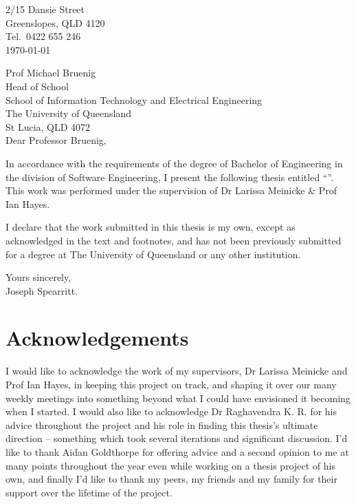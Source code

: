 
\cleardoublepage

\begin{flushright}
	2/15 Dansie Street\\
	Greenslopes, QLD 4120\\
	Tel.\ 0422 655 246\\
	\medskip
	\today
\end{flushright}
\begin{flushleft}
	Prof Michael Bruenig\\
	Head of School\\
	School of Information Technology and Electrical Engineering\\
	The University of Queensland\\
	St Lucia, QLD 4072\\
	\bigskip\bigskip
	Dear Professor Bruenig,
\end{flushleft}

In accordance with the requirements of the degree of Bachelor of Engineering in the division of Software Engineering, I present the following thesis entitled ``\thetitle''. This work was performed under the supervision of Dr Larissa Meinicke \& Prof Ian Hayes.

I declare that the work submitted in this thesis is my own, except as
acknowledged in the text and footnotes, and has not been previously
submitted for a degree at The University of Queensland or any other
institution.
\newline
\begin{flushright}
	Yours sincerely,\\
	\medskip
	$ \; $\vspace*{5mm}\\
	\medskip
	Joseph Spearritt.
\end{flushright}

\cleardoublepage

\chapter{Acknowledgements}

I would like to acknowledge the work of my supervisors, Dr Larissa Meinicke and Prof Ian Hayes, in keeping this project on track, and shaping it over our many weekly meetings into something beyond what I could have envisioned it becoming when I started. I would also like to acknowledge Dr Raghavendra K. R. for his advice throughout the project and his role in finding this thesis's ultimate direction -- something which took several iterations and significant discussion. I'd like to thank Aidan Goldthorpe for offering advice and a second opinion to me at many points throughout the year even while working on a thesis project of his own, and finally I'd like to thank my peers, my friends and my family for their support over the lifetime of the project.


